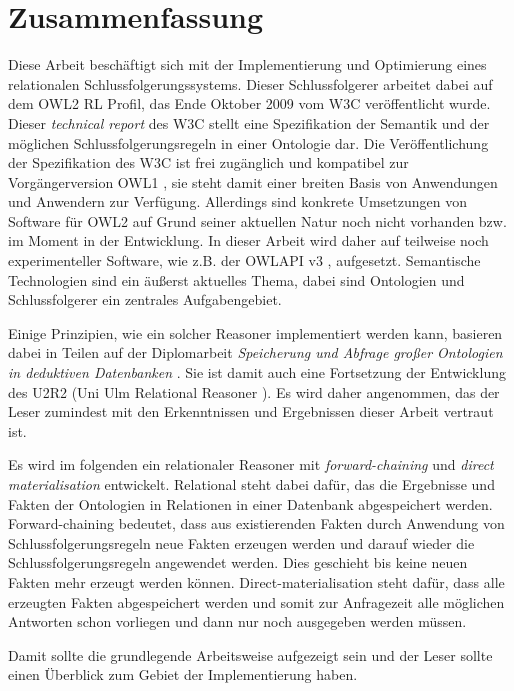 \section*{Zusammenfassung}

Diese Arbeit beschäftigt sich mit der Implementierung und Optimierung eines relationalen Schlussfolgerungssystems. Dieser Schlussfolgerer arbeitet dabei auf dem OWL2 RL Profil, das Ende Oktober 2009 vom W3C \cite{OWL2Profiles} veröffentlicht wurde. Dieser \emph{technical report} des W3C stellt eine Spezifikation der Semantik und der möglichen Schlussfolgerungsregeln in einer Ontologie dar. Die Veröffentlichung der Spezifikation des W3C ist frei zugänglich und kompatibel zur Vorgängerversion OWL1 \cite{OWL1}, sie steht damit einer breiten Basis von Anwendungen und Anwendern zur Verfügung. Allerdings sind konkrete Umsetzungen von Software für OWL2 auf Grund seiner aktuellen Natur noch nicht vorhanden bzw. im Moment in der Entwicklung. In dieser Arbeit wird daher auf teilweise noch experimenteller Software, wie z.B. der OWLAPI v3 \cite{OWLAPI}, aufgesetzt. Semantische Technologien sind ein äußerst aktuelles Thema, dabei sind Ontologien und Schlussfolgerer ein zentrales Aufgabengebiet.

Einige Prinzipien, wie ein solcher Reasoner implementiert werden kann, basieren dabei in Teilen auf der Diplomarbeit \emph{Speicherung und Abfrage großer Ontologien in deduktiven Datenbanken} \cite{Weithoehner2003}. Sie ist damit auch eine Fortsetzung der Entwicklung des U2R2 (Uni Ulm Relational Reasoner \cite{Weithoehner2008}). Es wird daher angenommen, das der Leser zumindest mit den Erkenntnissen und Ergebnissen dieser Arbeit vertraut ist.

Es wird im folgenden ein relationaler Reasoner mit \emph{forward-chaining} und \emph{direct materialisation} entwickelt. Relational steht dabei dafür, das die Ergebnisse und Fakten der Ontologien in Relationen in einer Datenbank abgespeichert werden. Forward-chaining bedeutet, dass aus existierenden Fakten durch Anwendung von Schlussfolgerungsregeln neue Fakten erzeugen werden und darauf wieder die Schlussfolgerungsregeln angewendet werden. Dies geschieht bis keine neuen Fakten mehr erzeugt werden können. Direct-materialisation steht dafür, dass alle erzeugten Fakten abgespeichert werden und somit zur Anfragezeit alle möglichen Antworten schon vorliegen und dann nur noch ausgegeben werden müssen.


Damit sollte die grundlegende Arbeitsweise aufgezeigt sein und der Leser sollte einen Überblick zum Gebiet der Implementierung haben.